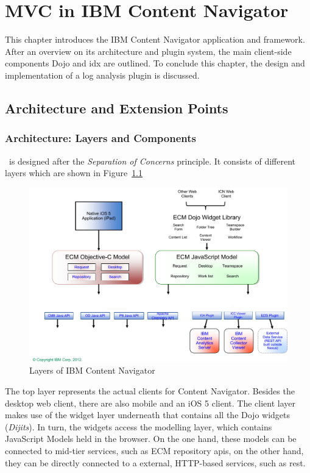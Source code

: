 \chapter{MVC in IBM Content Navigator}
\label{chap:nexus}
This chapter introduces the IBM Content Navigator application and framework. After an overview on its architecture and plugin system, the main client-side components Dojo and \ac{idx} are outlined. To conclude this chapter, the design and implementation of a log analysis plugin is discussed.
\section{Architecture and Extension Points}

\subsection{Architecture: Layers and Components}
\nexus\ is designed after the \emph{Separation of Concerns} principle. It consists of different layers which are shown in Figure~\ref{fig:nexuslayers}

\begin{figure}[H]
	\centering
	\includegraphics[width=14cm]{images/nexuslayers.pdf}
	\caption{Layers of IBM Content Navigator}
	\label{fig:nexuslayers}
\end{figure}

The top layer represents the actual clients for Content Navigator. Besides the desktop web client, there are also mobile and an iOS 5 client. The client layer makes use of the widget layer underneath that contains all the Dojo widgets (\emph{Dijits}). In turn, the widgets access the modelling layer, which contains JavaScript Models held in the browser. On the one hand, these models can be connected to mid-tier services, such as ECM repository \glspl{api}, on the other hand, they can be directly connected to a external, HTTP-based services, such as \ac{rest}.

